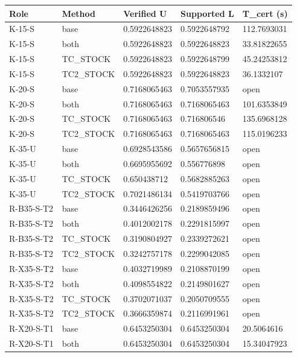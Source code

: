 \documentclass[
  american,
  11pt,
]{article}
\newcounter{none} %
\begin{document}
{\def\LTcaptype{none} %
\begin{longtable}[]{@{}lllll@{}}
\toprule\noalign{}
Role & Method & Verified U & Supported L & T\_\allowbreak{}cert (s) \\
\midrule\noalign{}
\endhead
\bottomrule\noalign{}
\endlastfoot
K-15-S & base & 0.5922648823 & 0.5922648792 & 112.7693031 \\
K-15-S & both & 0.5922648823 & 0.5922648823 & 33.81822655 \\
K-15-S & TC\_\allowbreak{}STOCK & 0.5922648823 & 0.5922648799 & 45.24253812 \\
K-15-S & TC2\_\allowbreak{}STOCK & 0.5922648823 & 0.5922648823 & 36.1332107 \\
K-20-S & base & 0.7168065463 & 0.7053557935 & open \\
K-20-S & both & 0.7168065463 & 0.7168065463 & 101.6353849 \\
K-20-S & TC\_\allowbreak{}STOCK & 0.7168065463 & 0.716806546 & 135.6968128 \\
K-20-S & TC2\_\allowbreak{}STOCK & 0.7168065463 & 0.7168065463 & 115.0196233 \\
K-35-U & base & 0.6928543586 & 0.5657656815 & open \\
K-35-U & both & 0.6695955692 & 0.556776898 & open \\
K-35-U & TC\_\allowbreak{}STOCK & 0.650438712 & 0.5682885263 & open \\
K-35-U & TC2\_\allowbreak{}STOCK & 0.7021486134 & 0.5419703766 & open \\
R-B35-S-T2 & base & 0.3446426256 & 0.2189859496 & open \\
R-B35-S-T2 & both & 0.4012002178 & 0.2291815997 & open \\
R-B35-S-T2 & TC\_\allowbreak{}STOCK & 0.3190804927 & 0.2339272621 & open \\
R-B35-S-T2 & TC2\_\allowbreak{}STOCK & 0.3242757178 & 0.2299042085 & open \\
R-X35-S-T2 & base & 0.4032719989 & 0.2108870199 & open \\
R-X35-S-T2 & both & 0.4098554822 & 0.2149801627 & open \\
R-X35-S-T2 & TC\_\allowbreak{}STOCK & 0.3702071037 & 0.2050709555 & open \\
R-X35-S-T2 & TC2\_\allowbreak{}STOCK & 0.3666359874 & 0.2116991961 & open \\
R-X20-S-T1 & base & 0.6453250304 & 0.6453250304 & 20.5064616 \\
R-X20-S-T1 & both & 0.6453250304 & 0.6453250304 & 15.34047923 \\

\end{longtable}}
\end{document}
